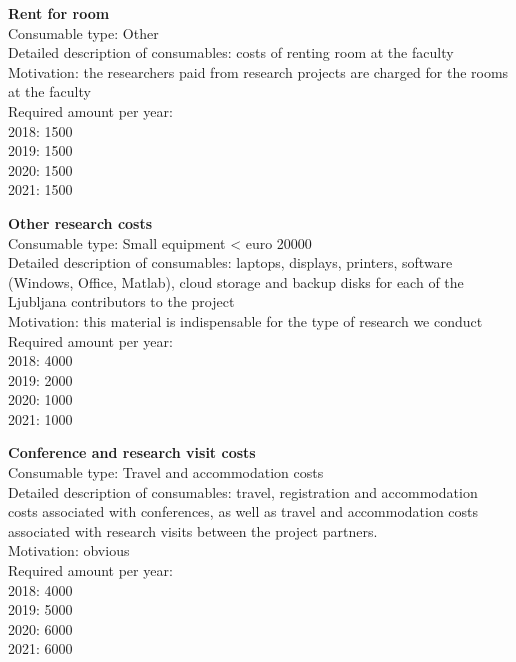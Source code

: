 \documentclass[11pt,dvipsnames,usenames,a4paper]{article}
\begin{document}
{\bf Rent for room}\\
Consumable type: Other\\
Detailed description of consumables: costs of renting room at the faculty \\
Motivation: the researchers paid from research projects are charged for the rooms at the faculty    \\
Required amount per year:\\
2018: 1500\\
2019: 1500\\
2020: 1500\\
2021: 1500

{\bf Other research costs}\\
Consumable type: Small equipment < euro 20000\\
Detailed description of consumables: laptops, displays, printers, software (Windows, Office, Matlab), cloud storage and backup disks for each of the Ljubljana contributors to the project\\
Motivation: this material is indispensable for the type of research we conduct\\
Required amount per year:\\
2018: 4000\\
2019: 2000\\
2020: 1000\\
2021: 1000

{\bf Conference and research visit costs}\\
Consumable type: Travel and accommodation costs\\
Detailed description of consumables: travel, registration and accommodation costs associated with conferences, as well as travel and accommodation costs associated with research visits between the project partners.\\
Motivation: obvious\\
Required amount per year:\\
2018: 4000\\
2019: 5000\\
2020: 6000\\
2021: 6000\\
\end{document}

